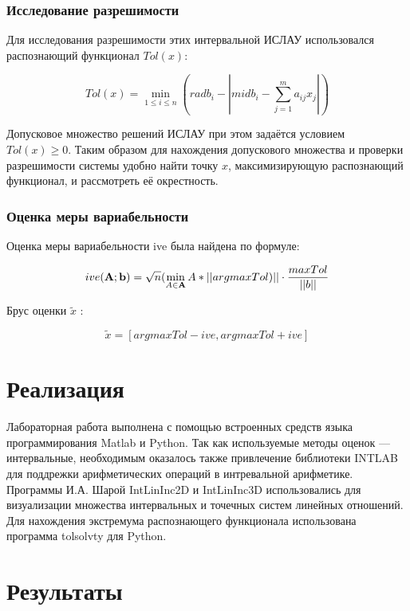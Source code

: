 \documentclass[12pt,a4paper]{scrartcl}
\begin{document}
\subsubsection{Исследование разрешимости}

	Для исследования разрешимости этих интервальной ИСЛАУ использовался распознающий функционал $Tol (x)$:

	\begin{equation}
		Tol(x) = \min_{1 \leq i \leq n}{(radb_i - |midb_i - \sum_{j=1}^m{a_{ij}x_j}|)}
	\end{equation}

	Допусковое множество решений ИСЛАУ при этом задаётся условием $Tol(x) \geq 0$. Таким образом для нахождения 	допускового множества и проверки разрешимости системы удобно найти точку $x$, максимизирующую распознающий функционал, и рассмотреть её окрестность.

\subsubsection{Оценка меры вариабельности}

	Оценка меры вариабельности ive была найдена по формуле:
	
	\begin{equation}
		ive(\bold{A}; \bold{b}) = \sqrt{n}(\min_{A \in \bold{A}}{A}*||argmax{Tol})|| \cdot \frac{max Tol}{||b||}
		\label{eq:ive}
	\end{equation}

	Брус оценки 	$\tilde x$ :
	
	\begin{equation}
		\tilde x = [argmax Tol - ive, argmax Tol + ive]
		\label{eq:brus}
	\end{equation}


\section {Реализация}
Лабораторная работа выполнена с помощью встроенных средств языка программирования Matlab и Python. Так как используемые методы оценок — интервальные, необходимым оказалось также привлечение библиотеки INTLAB для поддрежки арифметических операций в интревальной арифметике. Программы И.А. Шарой IntLinInc2D и IntLinInc3D использовались для визуализации множества интервальных и точечных систем линейных отношений.
Для нахождения экстремума распознающего функционала использована программа tolsolvty для Python.

\section {Результаты}
\end{document}
